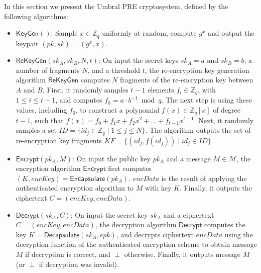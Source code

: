 \documentclass{amsart}
\begin{document}
In this section we present the Umbral PRE cryptosystem, defined by the following algorithms:

\begin{itemize}
	\item $\mathsf{KeyGen}()$: Sample $x \in \mathbb Z_q$ uniformly at random, compute $g^x$ and output the keypair $(pk, sk) = (g^x, x)$.

	\item $\mathsf{ReKeyGen}(sk_A, sk_B, N, t)$: On input the secret keys $sk_{A} = a$ and $sk_{B} = b$, a number of fragments $N$, and a threshold $t$, the re-encryption key generation algorithm $\mathsf{ReKeyGen}$ computes $N$ fragments of the re-encryption key between $A$ and $B$. 
	First, it randomly samples $t-1$ elements $f_i\in \mathbb Z_q$, with $1 \leq i \leq t-1$, and  computes $f_0 = a \cdot b^{-1} \bmod q$. The next step is using these values, including $f_0$, to construct a polynomial $f(x) \in \mathbb Z_q[x]$ of degree $t-1$, such that $f(x) = f_0 + f_1x + f_2x^2 + ... + f_{t-1}x^{t-1}$.  Next, it randomly samples a set $ID = \{ id_j \in \mathbb Z_q\mid 1 \leq j \leq N\}$. The algorithm outputs the set of re-encryption key fragments $KF = \{ ( id_j, f(id_j)) \mid id_j \in ID\}$.

	\item $\mathsf{Encrypt}(pk_A, M)$: On input the public key $pk_A$ and a message $M\in\mathcal{M}$, the encryption algorithm $\mathsf{Encrypt}$ first computes $(K, encKey) = \mathsf{Encapsulate}(pk_A)$.  
	$encData$ is the result of applying the authenticated encryption algorithm to $M$ with key $K$. 
	Finally, it outputs the ciphertext $C = (encKey, encData)$.
	
		\item $\mathsf{Decrypt}(sk_A, C)$: On input the secret key $sk_A$ and a ciphertext $C = (encKey, encData)$, the decryption algorithm $\mathsf{Decrypt}$ %
		computes the key $K = \mathsf{Decapsulate}(sk_A, epk)$, and decrypts ciphertext $encData$ using the decryption function of the authenticated encryption scheme to obtain message $M$ if decryption is correct, and $\perp$ otherwise. Finally, it outputs message $M$ (or $\perp$ if decryption was invalid).


\end{itemize}
\end{document}
